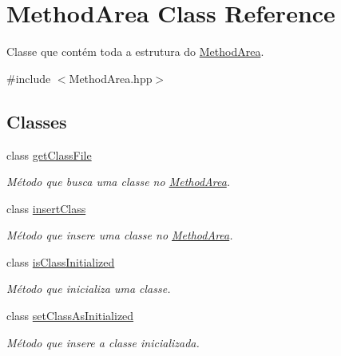 \hypertarget{classMethodArea}{}\section{Method\+Area Class Reference}
\label{classMethodArea}


Classe que contém toda a estrutura do \hyperlink{classMethodArea}{Method\+Area}.  




{\ttfamily \#include $<$Method\+Area.\+hpp$>$}

\subsection*{Classes}
\begin{DoxyCompactItemize}
\item 
class \hyperlink{classMethodArea_1_1getClassFile}{get\+Class\+File}
\begin{DoxyCompactList}\small\item\em Método que busca uma classe no \hyperlink{classMethodArea}{Method\+Area}. \end{DoxyCompactList}\item 
class \hyperlink{classMethodArea_1_1insertClass}{insert\+Class}
\begin{DoxyCompactList}\small\item\em Método que insere uma classe no \hyperlink{classMethodArea}{Method\+Area}. \end{DoxyCompactList}\item 
class \hyperlink{classMethodArea_1_1isClassInitialized}{is\+Class\+Initialized}
\begin{DoxyCompactList}\small\item\em Método que inicializa uma classe. \end{DoxyCompactList}\item 
class \hyperlink{classMethodArea_1_1setClassAsInitialized}{set\+Class\+As\+Initialized}
\begin{DoxyCompactList}\small\item\em Método que insere a classe inicializada. \end{DoxyCompactList}\end{DoxyCompactItemize}
